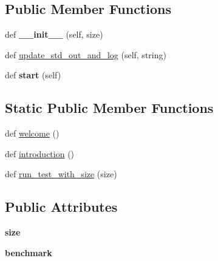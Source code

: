 \subsection*{Public Member Functions}
\begin{DoxyCompactItemize}
\item 
def {\bfseries \+\_\+\+\_\+init\+\_\+\+\_\+} (self, size)\hypertarget{classhal_1_1profile_1_1performance_1_1_eight_queen_test_aff4c0640adbaf044ee1a2f1d20480647}{}\label{classhal_1_1profile_1_1performance_1_1_eight_queen_test_aff4c0640adbaf044ee1a2f1d20480647}

\item 
def \hyperlink{classhal_1_1profile_1_1performance_1_1_eight_queen_test_a39eed18e353b03f5ab738496826544f0}{update\+\_\+std\+\_\+out\+\_\+and\+\_\+log} (self, string)
\item 
def {\bfseries start} (self)\hypertarget{classhal_1_1profile_1_1performance_1_1_eight_queen_test_aae7444405fb2139e4261aa639e27892f}{}\label{classhal_1_1profile_1_1performance_1_1_eight_queen_test_aae7444405fb2139e4261aa639e27892f}

\end{DoxyCompactItemize}
\subsection*{Static Public Member Functions}
\begin{DoxyCompactItemize}
\item 
def \hyperlink{classhal_1_1profile_1_1performance_1_1_eight_queen_test_a981be709c0e10f0098a8c58af1929746}{welcome} ()
\item 
def \hyperlink{classhal_1_1profile_1_1performance_1_1_eight_queen_test_a570aa1a773c9d24cca31e6a42e852fd4}{introduction} ()
\item 
def \hyperlink{classhal_1_1profile_1_1performance_1_1_eight_queen_test_a1830ea92c280cbd39a65c7fc36176e89}{run\+\_\+test\+\_\+with\+\_\+size} (size)
\end{DoxyCompactItemize}
\subsection*{Public Attributes}
\begin{DoxyCompactItemize}
\item 
{\bfseries size}\hypertarget{classhal_1_1profile_1_1performance_1_1_eight_queen_test_afefe08b8ae5a8a787f867d97cc2d6ad4}{}\label{classhal_1_1profile_1_1performance_1_1_eight_queen_test_afefe08b8ae5a8a787f867d97cc2d6ad4}

\item 
{\bfseries benchmark}\hypertarget{classhal_1_1profile_1_1performance_1_1_eight_queen_test_a537a15f71e5641f883b9e54acd04d163}{}\label{classhal_1_1profile_1_1performance_1_1_eight_queen_test_a537a15f71e5641f883b9e54acd04d163}

\end{DoxyCompactItemize}


